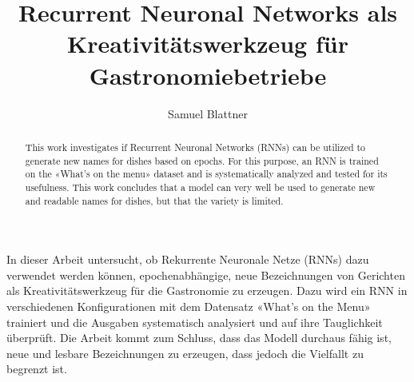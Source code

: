 \documentclass{ffhsthesis}
\begin{document}
    \title{Recurrent Neuronal Networks als Kreativitätswerkzeug für Gastronomiebetriebe}
    \author{Samuel Blattner}


    \maketitle

    \begin{zusammenfassung}
        In dieser Arbeit untersucht, ob Rekurrente Neuronale Netze (RNNs) dazu verwendet werden können,
        epochenabhängige, neue Bezeichnungen von Gerichten als Kreativitätswerkzeug für die Gastronomie zu erzeugen.
        Dazu wird ein RNN in verschiedenen Konfigurationen mit dem Datensatz «What's on the Menu» trainiert und
        die Ausgaben systematisch analysiert und auf ihre Tauglichkeit überprüft.
        Die Arbeit kommt zum Schluss, dass das Modell durchaus fähig ist, neue und lesbare Bezeichnungen zu erzeugen,
        dass jedoch die Vielfallt zu begrenzt ist.
    \end{zusammenfassung}

    \begin{abstract}
        This work investigates if Recurrent Neuronal Networks (RNNs) can be utilized to generate new names for
        dishes based on epochs.
        For this purpose, an RNN is trained on the «What's on the menu» dataset and is systematically analyzed and
        tested for its usefulness.
        This work concludes that a model can very well be used to generate new and readable names for dishes, but
        that the variety is limited.
    \end{abstract}

    \setcounter{tocdepth}{1}
    \tableofcontents

    \startThesis %

    
    
    
    
    
    
    


    \listoffigures
\end{document}
